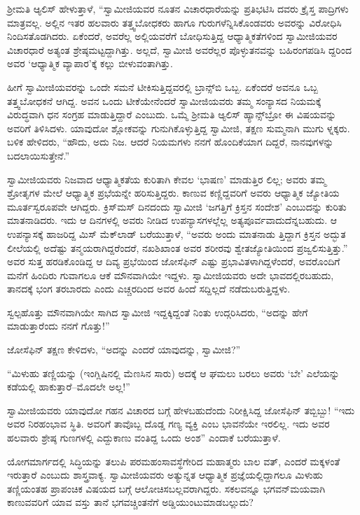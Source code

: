 ಶ್ರೀಮತಿ ಆ್ಯಲಿಸ್ ಹೇಳುತ್ತಾಳೆ, “ಸ್ವಾಮೀಜಿಯವರ ನೂತನ ವಿಚಾರಧಾರೆಯನ್ನು ಪ್ರತಿಭಟಿಸಿ ದವರು ಕ್ರೈಸ್ತ ಪಾದ್ರಿಗಳು ಮಾತ್ರವಲ್ಲ. ಅಲ್ಲಿನ ಇತರ ಹಲವಾರು ತತ್ತ್ವಬೋಧಕರು ಹಾಗೂ ಗುರುಗಳೆನ್ನಿಸಿಕೊಂಡವರು ಅವರನ್ನು ವಿರೋಧಿಸಿ ನಿಂದಿಸತೊಡಗಿದರು. ಏಕೆಂದರೆ, ಅವರೆಲ್ಲ ಅಲ್ಲಿಯವರೆಗೆ ಬೋಧಿಸುತ್ತಿದ್ದ ಆಧ್ಯಾತ್ಮಿಕತೆಗಳಿಂದ ಸ್ವಾಮೀಜಿಯವರ ವಿಚಾರಧಾರೆ ಅತ್ಯಂತ ಶ್ರೇಷ್ಠಮಟ್ಟದ್ದಾಗಿತ್ತು. ಅಲ್ಲದೆ, ಸ್ವಾಮೀಜಿ ಅವರೆಲ್ಲರ ಪೊಳ್ಳುತನವನ್ನು ಬಹಿರಂಗಪಡಿಸಿ ದ್ದರಿಂದ ಅವರ ‘ಆಧ್ಯಾತ್ಮಿಕ ವ್ಯಾಪಾರ’ಕ್ಕೆ ಕಲ್ಲು ಬೀಳುವಂತಾಗಿತ್ತು.

ಹೀಗೆ ಸ್ವಾಮೀಜಿಯವರನ್ನು ಒಂದೇ ಸಮನೆ ಟೀಕಿಸುತ್ತಿದ್ದವರಲ್ಲಿ ಬ್ರಾನ್ಸ್​ಬಿ ಒಬ್ಬ. ಏಕೆಂದರೆ ಅವನೂ ಒಬ್ಬ ತತ್ತ್ವಬೋಧಕನೆ ಆಗಿದ್ದ. ಅವನ ಒಂದು ಟೀಕೆಯೇನೆಂದರೆ ಸ್ವಾಮೀಜಿಯವರು ತಮ್ಮ ಸಂನ್ಯಾಸದ ನಿಯಮಕ್ಕೆ ವಿರುದ್ಧವಾಗಿ ಧನ ಸಂಗ್ರಹ ಮಾಡುತ್ತಿದ್ದಾರೆ ಎಂಬುದು. ಒಮ್ಮೆ ಶ್ರೀಮತಿ ಆ್ಯಲಿಸ್ ಹ್ಯಾನ್ಸ್​ಬ್ರೋ ಈ ವಿಷಯವನ್ನು ಅವರಿಗೆ ತಿಳಿಸಿದಳು. ಯಾವುದೋ ಶ್ಲೋಕವನ್ನು ಗುನುಗಿಕೊಳ್ಳುತ್ತಿದ್ದ ಸ್ವಾಮೀಜಿ, ತಕ್ಷಣ ಸುಮ್ಮನಾಗಿ ಮುಗು ಳ್ನಕ್ಕರು. ಬಳಿಕ ಹೇಳಿದರು, “ಹೌದು, ಅದು ನಿಜ. ಆದರೆ ನಿಯಮಗಳು ನನಗೆ ಹೊಂದಿಕೆಯಾಗ ದಿದ್ದರೆ, ನಾನವುಗಳನ್ನು ಬದಲಾಯಿಸುತ್ತೇನೆ.”

ಸ್ವಾಮೀಜಿಯವರು ನಿಜವಾದ ಆಧ್ಯಾತ್ಮಿಕತೆಯ ಕುರಿತಾಗಿ ಕೇವಲ ‘ಭಾಷಣ’ ಮಾಡುತ್ತಿರ ಲಿಲ್ಲ; ಅವರು ತಮ್ಮ ಶ್ರೋತೃಗಳ ಮೇಲೆ ಆಧ್ಯಾತ್ಮಿಕ ಪ್ರಭೆಯನ್ನೇ ಹರಿಸುತ್ತಿದ್ದರು. ಕಾಣುವ ಕಣ್ಣಿದ್ದವರಿಗೆ ಅವರು ಆಧ್ಯಾತ್ಮಿಕ ಜ್ಯೋತಿಯ ಮೂರ್ತಸ್ವರೂಪವೇ ಆಗಿದ್ದರು. ಕ್ರಿಸ್​ಮಸ್ ದಿನದಂದು ಸ್ವಾಮೀಜಿ ‘ಜಗತ್ತಿಗೆ ಕ್ರಿಸ್ತನ ಸಂದೇಶ’ ಎಂಬುದನ್ನು ಕುರಿತು ಮಾತನಾಡಿದರು. ಇದು ಆ ದಿನಗಳಲ್ಲಿ ಅವರು ನೀಡಿದ ಉಪನ್ಯಾಸಗಳಲ್ಲೆಲ್ಲ ಅತ್ಯಪೂರ್ವವಾದುದೆನ್ನಬಹುದು. ಆ ಉಪನ್ಯಾಸಕ್ಕೆ ಹಾಜರಿದ್ದ ಮಿಸ್ ಮೆಕ್​ಲಾಡ್ ಬರೆಯುತ್ತಾಳೆ, “ಅವರು ಅಂದು ಮಾತನಾಡು ತ್ತಿದ್ದಾಗ ಕ್ರಿಸ್ತನ ಅದ್ಭುತ ಲೀಲೆಯಲ್ಲಿ ಅದೆಷ್ಟು ತನ್ಮಯರಾಗಿದ್ದರೆಂದರೆ, ನಖಶಿಖಾಂತ ಅವರ ಶರೀರವು ಶ್ವೇತಜ್ಯೋತಿಯಿಂದ ಪ್ರಜ್ವಲಿಸುತ್ತಿತ್ತು.” ಅವರ ಸುತ್ತ ಹರಡಿಕೊಂಡಿದ್ದ ಆ ದಿವ್ಯ ಪ್ರಭೆಯಿಂದ ಜೋಸೆಫಿನ್ ಎಷ್ಟು ಪ್ರಭಾವಿತಳಾಗಿದ್ದಳೆಂದರೆ, ಅವರೊಂದಿಗೆ ಮನೆಗೆ ಹಿಂದಿರು ಗುವಾಗಲೂ ಆಕೆ ಮೌನವಾಗಿಯೇ ಇದ್ದಳು. ಸ್ವಾಮೀಜಿಯವರು ಅದೇ ಭಾವದಲ್ಲಿರಬಹುದು, ತಾನದಕ್ಕೆ ಭಂಗ ತರಬಾರದು ಎಂದು ಎಚ್ಚರದಿಂದ ಅವರ ಹಿಂದೆ ಸದ್ದಿಲ್ಲದೆ ನಡೆದುಬರುತ್ತಿದ್ದಳು.

ಸ್ವಲ್ಪಹೊತ್ತು ಮೌನವಾಗಿಯೇ ಸಾಗಿದ ಸ್ವಾಮೀಜಿ ಇದ್ದಕ್ಕಿದ್ದಂತೆ ನಿಂತು ಉದ್ಗರಿಸಿದರು, “ಅದನ್ನು ಹೇಗೆ ಮಾಡುತ್ತಾರೆಂದು ನನಗೆ ಗೊತ್ತು!”

ಜೋಸೆಫಿನ್ ತಕ್ಷಣ ಕೇಳಿದಳು, “ಅದನ್ನು ಎಂದರೆ ಯಾವುದನ್ನು, ಸ್ವಾಮೀಜಿ?”

“ಮಿಳುಹು ತಣ್ಣಿಯನ್ನು (ಇಂಗ್ಲಿಷಿನಲ್ಲಿ ಮೆಣಸಿನ ಸಾರು) ಅದಕ್ಕೆ ಆ ಘಮಲು ಬರಲು ಅವರು ‘ಬೇ’ ಎಲೆಯನ್ನು ಕಡೆಯಲ್ಲಿ ಹಾಕುತ್ತಾರೆ–ಮೊದಲೇ ಅಲ್ಲ!”

ಸ್ವಾಮೀಜಿಯವರು ಯಾವುದೋ ಗಹನ ವಿಚಾರದ ಬಗ್ಗೆ ಹೇಳಬಹುದೆಂದು ನಿರೀಕ್ಷಿಸಿದ್ದ ಜೋಸೆಫಿನ್ ತಬ್ಬಿಬ್ಬು! “ಇದು ಅವರ ನಿರಹಂಭಾವ ಸ್ಥಿತಿ. ಅವರಿಗೆ ತಾವೊಬ್ಬ ದೊಡ್ಡ ಗಣ್ಯ ವ್ಯಕ್ತಿ ಎಂಬ ಭಾವನೆಯೇ ಇರಲಿಲ್ಲ. ಇದು ಅವರ ಹಲವಾರು ಶ್ರೇಷ್ಠ ಗುಣಗಳಲ್ಲಿ ಎದ್ದುಕಾಣು ವಂತಿದ್ದ ಒಂದು ಅಂಶ” ಎಂದಾಕೆ ಬರೆಯುತ್ತಾಳೆ.

ಯೋಗಮಾರ್ಗದಲ್ಲಿ ಸಿದ್ಧಿಯನ್ನು ತಲುಪಿ ಪರಮಹಂಸಾವಸ್ಥೆಗೇರಿದ ಮಹಾತ್ಮರು ಬಾಲ ವತ್, ಎಂದರೆ ಮಕ್ಕಳಂತೆ ಇರುತ್ತಾರೆ ಎಂಬುದು ಶಾಸ್ತ್ರವಾಕ್ಯ. ಸ್ವಾಮೀಜಿಯವರು ಅತ್ಯುನ್ನತ ಆಧ್ಯಾತ್ಮಿಕ ಪ್ರಜ್ಞೆಯಲ್ಲಿದ್ದಾಗಲೂ ಮಿಳುಹು ತಣ್ಣಿಯಂತಹ ಪ್ರಾಪಂಚಿಕ ವಿಷಯದ ಬಗ್ಗೆ ಆಲೋಚಿಸಬಲ್ಲವರಾಗಿದ್ದರು. ಸಕಲವನ್ನೂ ಭಗವನ್​ಮಯವಾಗಿ ಕಾಣುವವರಿಗೆ ಯಾವ ವಸ್ತು ತಾನೆ ಭಗವಚ್ಚಿಂತನೆಗೆ ಅಡ್ಡಿಯುಂಟುಮಾಡಬಲ್ಲುದು?

